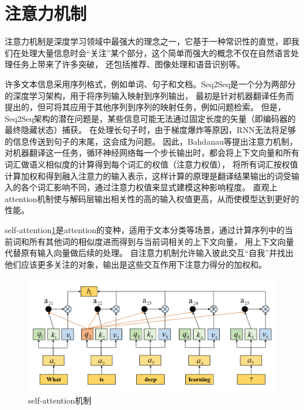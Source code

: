

\section{注意力机制}
注意力机制是深度学习领域中最强大的理念之一，它基于一种常识性的直觉，即我们在处理大量信息时会“关注”某个部分，这个简单而强大的概念不仅在自然语言处理任务上带来了许多突破，
还包括推荐、图像处理和语音识别等。

许多文本信息采用序列格式，例如单词、句子和文档。Seq2Seq是一个分为两部分的深度学习架构，用于将序列输入映射到序列输出，
最初是针对机器翻译任务而提出的，但可将其应用于其他序列到序列的映射任务，例如问题检索。
但是，Seq2Seq架构的潜在问题是，某些信息可能无法通过固定长度的矢量（即编码器的最终隐藏状态）捕获。
在处理长句子时，由于梯度爆炸等原因，RNN无法将足够的信息传送到句子的末尾，这会成为问题。
因此，Bahdanau等\cite{bahdanau2014neural}提出注意力机制，对机器翻译这一任务，循环神经网络每一个步长输出时，都会将上下文向量和所有词汇做语义相似度的计算得到每个词汇的权值（注意力权值），
将所有词汇按权值计算加权和得到融入注意力的输入表示，这样计算的原理是翻译结果输出的词受输入的各个词汇影响不同，通过注意力权值来显式建模这种影响程度。
直观上attention机制使与解码层输出相关性的高的输入权值更高，从而使模型达到更好的性能。

self-attention\ref{fig:attent}是attention的变种，适用于文本分类等场景，通过计算序列中的当前词和所有其他词的相似度进而得到与当前词相关的上下文向量，
用上下文向量代替原有输入向量做后续的处理。
自注意力机制允许输入彼此交互“自我”并找出他们应该更多关注的对象，输出是这些交互作用下注意力得分的加权和。
\begin{figure}[htbp]
  \centering
  \includegraphics[width=13cm]{./images/attention.png}
  \caption{self-attention机制}
  \label{fig:attent}
\end{figure}

